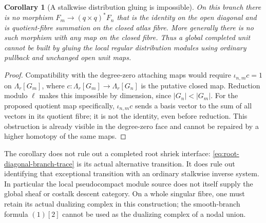 \documentclass[11pt]{article}
\newtheorem{corollary}[proposition]{Corollary}
\theoremstyle{definition}
\theoremstyle{remark}
\begin{document}
\begin{corollary}[A stalkwise distribution gluing is impossible]
\label{cor:root-diagonal-stalk-obstruction}
On this branch there is no morphism
$F_m\to(q\times q)^*F_n$ that is the identity on the open
diagonal and is quotient-fibre summation on the closed atlas
fibre.  More generally there is no such morphism with any map on
the closed fibre.  Thus a global completed unit cannot be built
by gluing the local regular distribution modules using ordinary
pullback and unchanged open unit maps.
\end{corollary}
\begin{proof}
Compatibility with the degree-zero attaching maps would require
$\iota_{n,m}c=1$ on $\Lambda_r[G_m]$, where
$c:\Lambda_r[G_m]\to\Lambda_r[G_n]$ is the putative closed
map.  Reduction modulo $\ell$ makes this impossible by dimension,
since $|G_n|<|G_m|$.  For the proposed quotient map specifically,
$\iota_{n,m}c$ sends a basis vector to the sum of all vectors in
its quotient fibre; it is not the identity, even before reduction.
This obstruction is already visible in the degree-zero face and
cannot be repaired by a higher homotopy of the same maps.
\end{proof}

The corollary does not rule out a completed root shriek interface:
\eqref{eq:root-diagonal-branch-trace} is its actual alternative
transition.  It does rule out identifying that exceptional
transition with an ordinary stalkwise inverse system.  In
particular the local pseudocompact module source does not itself
supply the global sheaf or costalk descent category.  On a whole
singular fibre, one must retain its actual dualizing complex in
this construction; the smooth-branch formula $(1)[2]$ cannot be
used as the dualizing complex of a nodal union.
\end{document}
